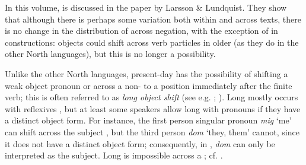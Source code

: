 \documentclass[output=paper]{langscibook}
\begin{document}
In this volume,  is discussed in the paper by Larsson \& Lundquist. They show that although there is perhaps some variation both within and across texts, there is no change in the distribution of  across negation, with the exception of  in  constructions: objects could shift across verb particles in older  (as they do in the other North  languages), but this is no longer a possibility.  



Unlike the other North  languages, present-day  has the possibility of shifting a weak object pronoun or  across a non- to a position immediately after the finite verb; this is often referred to as \textit{long object shift} (see e.g. \citealt{Holmberg1986}; \citealt{Heinat2010}). Long  mostly occurs with reflexives , but at least some speakers allow long  with pronouns if they have a distinct object form. For instance, the first person singular pronoun \textit{mig} ‘me’ can shift across the subject , but the third person \textit{dom} ‘they, them’ cannot, since it does not have a distinct object form; consequently, in , \textit{dom} can only be interpreted as the subject. Long  is impossible across a ; cf. .


\ea \label{ex:intro:20}



\end{document}
